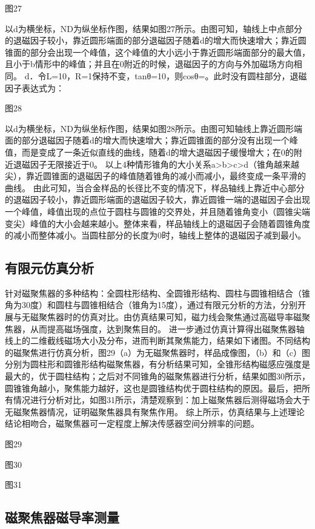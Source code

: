 \documentclass[a4paper,12pt，twoside]{ctexart}
\begin{document}
	图27\par 
	以d为横坐标，ND为纵坐标作图，结果如图27所示。由图可知，轴线上中点部分的退磁因子较小，靠近圆形端面的部分退磁因子随着d的增大而快速增大；靠近圆锥面的部分会出现一个峰值，这个峰值的大小远小于靠近圆形端面部分的最大值，且小于b情形中的峰值；并且在0附近的时候，退磁因子的方向与外加磁场方向相同。
	d．令L=10，R=1保持不变，tanθ=10，则cosθ=。此时没有圆柱部分，退磁因子表达式为：
	
	图28\par 
	以d为横坐标，ND为纵坐标作图，结果如图28所示。由图可知轴线上靠近圆形端面的部分退磁因子随着d的增大而快速增大；靠近圆锥面的部分没有出现一个峰值，而是变成了一条近似直线的曲线，随着d的增大退磁因子缓慢增大；在0的附近退磁因子无限接近于0。
	以上4种情形锥角的大小关系a>b>c>d（锥角越来越尖），靠近圆锥面的退磁因子的峰值随着锥角的减小而减小，最终变成一条平滑的曲线。
	由此可知，当合金样品的长径比不变的情况下，样品轴线上靠近中心部分的退磁因子较小，靠近圆形端面的退磁因子较大，靠近圆锥一端的退磁因子会出现一个峰值，峰值出现的点位于圆柱与圆锥的交界处，并且随着锥角变小（圆锥尖端变尖）峰值的大小会越来越小。整体来看，样品轴线上的退磁因子会随着圆锥角度的减小而整体减小。当圆柱部分的长度为0时，轴线上整体的退磁因子减到最小。
	\subsection{有限元仿真分析}
	针对磁聚焦器的多种结构：全圆柱形结构、全圆锥形结构、圆柱与圆锥相结合（锥角为30度）和圆柱与圆锥相结合（锥角为15度），通过有限元分析的方法，分别开展与无磁聚焦器时的仿真对比。由仿真结果可知，磁力线会聚焦通过高磁导率磁聚焦器，从而提高磁场强度，达到聚焦目的。
	进一步通过仿真计算得出磁聚焦器轴线上的二维截线磁场大小及分布，进而判断其聚焦能力，结果如下诸图。不同结构的磁聚焦进行仿真分析，图29（a）为无磁聚焦器时，样品成像图，（b）和（c）图分别为圆柱形和圆锥形结构磁聚焦器，有分析结果可知，全锥形结构磁感应强度是最大的，优于圆柱结构；之后对不同锥角的磁聚焦器进行分析，结果如图30所示，圆锥锥角越小，聚焦能力越好，这也是圆锥结构优于圆柱结构的原因。最后，把所有情况进行分析对比，如图31所示，清楚观察到：加上磁聚焦器后测得磁场会大于无磁聚焦器情况，证明磁聚焦器具有聚焦作用。
	综上所示，仿真结果与上述理论结论相吻合，磁聚焦器可一定程度上解决传感器空间分辨率的问题。
	
	图29\par 
	图30\par 
	图31\par 
	
	
	
	
	\subsection{磁聚焦器磁导率测量}
\end{document}
